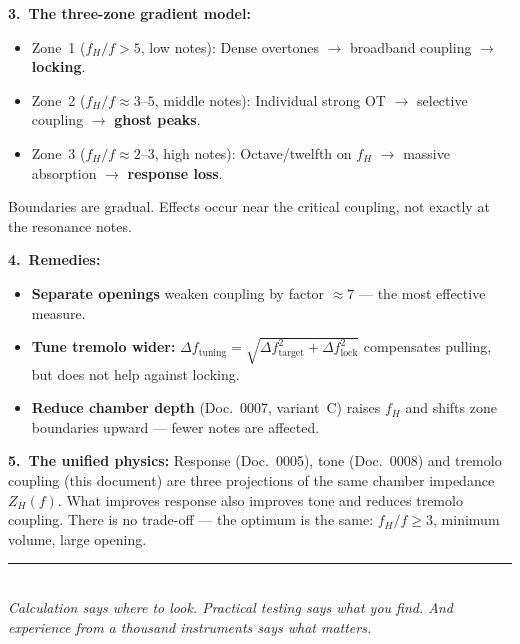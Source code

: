 \documentclass[11pt,a4paper]{article}
\begin{document}
\begin{keybox}
\textbf{3.\ The three-zone gradient model:}
\begin{itemize}[leftmargin=5mm, itemsep=1pt]
\item \textcolor{zone1blue}{Zone~1} ($f_H/f > 5$, low notes): Dense overtones $\to$ broadband coupling $\to$ \textbf{locking}.
\item \textcolor{zone2orange}{Zone~2} ($f_H/f \approx 3$--$5$, middle notes): Individual strong OT $\to$ selective coupling $\to$ \textbf{ghost peaks}.
\item \textcolor{zone3red}{Zone~3} ($f_H/f \approx 2$--$3$, high notes): Octave/twelfth on $f_H$ $\to$ massive absorption $\to$ \textbf{response loss}.
\end{itemize}
Boundaries are gradual. Effects occur near the critical coupling, not exactly at the resonance notes.
\end{keybox}

\begin{keybox}
\textbf{4.\ Remedies:}
\begin{itemize}[leftmargin=5mm, itemsep=1pt]
\item \textbf{Separate openings} weaken coupling by factor $\approx 7$ --- the most effective measure.
\item \textbf{Tune tremolo wider:} $\Delta f_\text{tuning} = \sqrt{\Delta f_\text{target}^2 + \Delta f_\text{lock}^2}$ compensates pulling, but does not help against locking.
\item \textbf{Reduce chamber depth} (Doc.~0007, variant~C) raises $f_H$ and shifts zone boundaries upward --- fewer notes are affected.
\end{itemize}
\end{keybox}

\begin{keybox}
\textbf{5.\ The unified physics:} Response (Doc.~0005), tone (Doc.~0008) and tremolo coupling (this document) are three projections of the same chamber impedance $Z_H(f)$. What improves response also improves tone and reduces tremolo coupling. There is no trade-off --- the optimum is the same: $f_H/f \geq 3$, minimum volume, large opening.
\end{keybox}

\vspace{3mm}
\begin{center}
\textcolor{accentred}{\rule{0.6\textwidth}{1pt}}\\[4pt]
{\small\itshape Calculation says where to look. Practical testing says what you find. And experience from a thousand instruments says what matters.}
\end{center}
\end{document}
